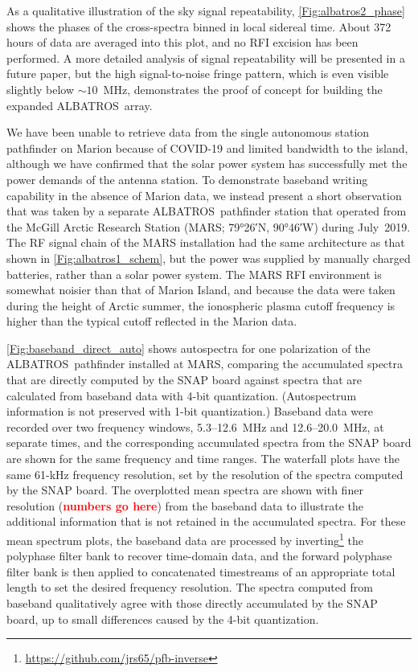 \documentclass{ws-jai}
\def\albatros{ALBATROS}
\newcommand{\attention}[1]{\textcolor{red}{\bf {#1}}}
\begin{document}
As a qualitative illustration of the sky signal repeatability,
\autoref{Fig:albatros2_phase} shows the phases of the cross-spectra
binned in local sidereal time.  About 372 hours of data are averaged
into this plot, and no RFI excision has been performed.  A more
detailed analysis of signal repeatability will be presented in a
future paper, but the high signal-to-noise fringe pattern, which is
even visible slightly below $\sim10$~MHz, demonstrates the proof of
concept for building the expanded \albatros\ array.


We have been unable to retrieve data from the single autonomous
station pathfinder on Marion because of COVID-19 and limited bandwidth
to the island, although we have confirmed that the solar power system
has successfully met the power demands of the antenna station.  To
demonstrate baseband writing capability in the absence of Marion data,
we instead present a short observation that was taken by a separate
\albatros\ pathfinder station that operated from the McGill Arctic
Research Station (MARS; \ang{79;26;}N, \ang{90;46;}W) during
July~2019.  The RF signal chain of the MARS installation had the same
architecture as that shown in \autoref{Fig:albatros1_schem}, but the
power was supplied by manually charged batteries, rather than a solar
power system.  The MARS RFI environment is somewhat noisier than that
of Marion Island, and because the data were taken during the height of
Arctic summer, the ionospheric plasma cutoff frequency is higher than
the typical cutoff reflected in the Marion data.

\autoref{Fig:baseband_direct_auto} shows autospectra for one
polarization of the \albatros\ pathfinder installed at MARS, comparing
the accumulated spectra that are directly computed by the SNAP board
against spectra that are calculated from baseband data with 4-bit
quantization.  (Autospectrum information is not preserved with 1-bit
quantization.)  Baseband data were recorded over two frequency
windows, 5.3--12.6~MHz and 12.6--20.0~MHz, at separate times, and the
corresponding accumulated spectra from the SNAP board are shown for
the same frequency and time ranges.  The waterfall plots have the same
61-kHz frequency resolution, set by the resolution of the spectra
computed by the SNAP board.  The overplotted mean spectra are shown
with finer resolution (\attention{numbers go here}) from the baseband
data to illustrate the additional information that is not retained in
the accumulated spectra.  For these mean spectrum plots, the baseband
data are processed by
inverting\footnote{\url{https://github.com/jrs65/pfb-inverse}} the
polyphase filter bank to recover time-domain data, and the forward
polyphase filter bank is then applied to concatenated timestreams of
an appropriate total length to set the desired frequency resolution.
The spectra computed from baseband qualitatively agree with those
directly accumulated by the SNAP board, up to small differences caused
by the 4-bit quantization.
\end{document}
